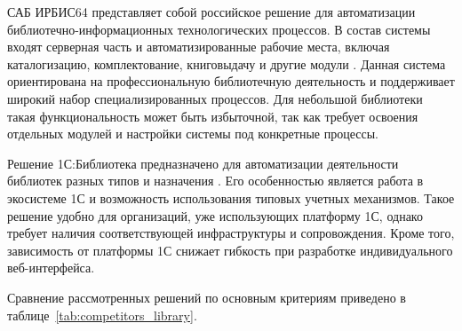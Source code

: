 САБ ИРБИС64 представляет собой российское решение для автоматизации
библиотечно-информационных технологических процессов. В состав системы входят
серверная часть и автоматизированные рабочие места, включая каталогизацию,
комплектование, книговыдачу и другие модули \cite{irbis64_elnit}. Данная система
ориентирована на профессиональную библиотечную деятельность и поддерживает широкий
набор специализированных процессов. Для небольшой библиотеки такая функциональность
может быть избыточной, так как требует освоения отдельных модулей и настройки
системы под конкретные процессы.

Решение 1С:Библиотека предназначено для автоматизации деятельности библиотек
разных типов и назначения \cite{onec_library}. Его особенностью является работа
в экосистеме 1С и возможность использования типовых учетных механизмов. Такое
решение удобно для организаций, уже использующих платформу 1С, однако требует
наличия соответствующей инфраструктуры и сопровождения. Кроме того, зависимость
от платформы 1С снижает гибкость при разработке индивидуального веб-интерфейса.

Сравнение рассмотренных решений по основным критериям приведено в
таблице~\ref{tab:competitors_library}.

